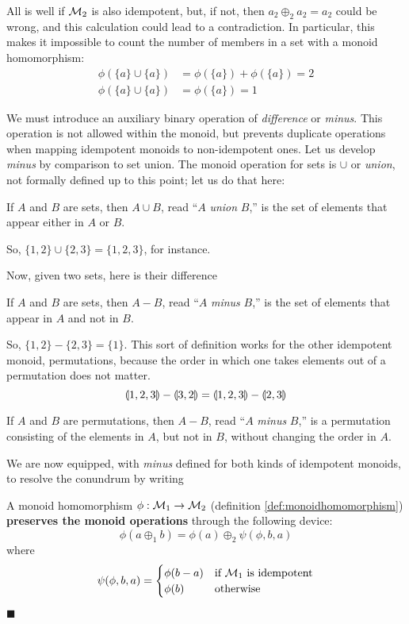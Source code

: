 All is well if $\mathcal{M}_{2}$ is also idempotent, but, if not, then $a_2\oplus_2 a_2=a_2$ could be wrong, and this calculation could lead to a contradiction. In particular, this makes it impossible to count the number of members in a set with a monoid homomorphism:
\begin{align*}
  \phi\left(\{a\}\cup\{a\}\right)&=\phi\left(\{a\}\right)+\phi\left(\{a\}\right)=2\\
  \phi\left(\{a\}\cup\{a\}\right)&=\phi\left(\{a\}\right)=1
\end{align*}


We must introduce an auxiliary binary operation of \emph{difference} or \emph{minus}. This operation is not allowed within the monoid, but prevents duplicate operations when mapping idempotent monoids to non-idempotent ones. Let us develop \emph{minus} by comparison to set union. The monoid operation for sets is $\cup$ or \emph{union}, not formally defined up to this point; let us do that here:
\begin{definition}
  If $A$ and $B$ are sets, then $A\cup B$, read ``$A$ \emph{union} $B$,'' is the set of elements that appear either in $A$ or $B$.
\end{definition}
So, $\{1,2\} \cup \{2,3\}=\{1,2,3\}$, for instance.


Now, given two sets, here is their difference
\begin{definition}
  If $A$ and $B$ are sets, then $A-B$, read ``$A$ \emph{minus} $B$,'' is the set of elements that appear in $A$ and not in $B$.
\end{definition}
So, $\{1,2\} - \{2,3\}=\{1\}$. This sort of definition works for the other idempotent monoid, permutations, because the order in which one takes elements out of a permutation does not matter. 
\begin{equation*}
  \llparenthesis 1,2,3 \rrparenthesis-\llparenthesis 3,2 \rrparenthesis = \llparenthesis 1,2,3 \rrparenthesis-\llparenthesis 2,3 \rrparenthesis
\end{equation*}


\begin{definition}
  If $A$ and $B$ are permutations, then $A-B$, read ``$A$ \emph{minus} $B$,'' is a permutation consisting of the elements in $A$, but not in $B$, without changing the order in $A$.
\end{definition}


We are now equipped, with \emph{minus} defined for both kinds of idempotent monoids, to resolve the conundrum by writing


\begin{definition} A monoid homomorphism $\phi : \mathcal{M}_{1}\rightarrow\mathcal{M}_{2}$ (definition \ref{def:monoidhomomorphism}) \textbf{preserves the monoid operations} through the following device:
\begin{equation}
  \phi(a \oplus_1 b) = \phi(a)\oplus_2\psi(\phi,b,a)
\end{equation}
where
\begin{equation}
  \psi(\phi,b,a)=
  \begin{cases}
    \phi(b-a) & \text{if $\mathcal{M}_{1}$ is idempotent} \\ 
    \phi(b)   & \text{otherwise}
  \end{cases}
\end{equation}
\end{definition}
$\blacksquare$


